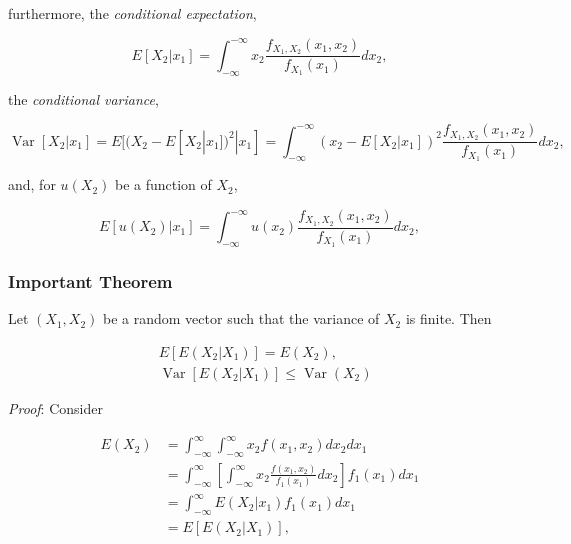 \documentclass{article}
\begin{document}
                furthermore, the \textit{conditional expectation},

                \begin{equation*}
                    E[X_{2} | x_{1}] = \int_{-\infty}^{-\infty} x_{2} \frac{
                     f_{X_{1}, X_{2}}(x_{1}, x_{2}) }{ f_{X_{1}}( x_{1}) } d x_{2},
                \end{equation*}

                the \textit{conditional variance},

                \begin{equation*}
                    \operatorname{Var}[X_{2} | x_{1}] = E[(X_{2} -E[X_{2} | x_{1}])^2 | x_{1}] = \int_{-\infty}^{-\infty} (x_{2} - E[X_{2} | x_{1}])^2 \frac{
                     f_{X_{1}, X_{2}}(x_{1}, x_{2}) }{ f_{X_{1}}( x_{1}) } d x_{2},
                \end{equation*}

                and, for $ u(X_{2}) $ be a function of $ X_{2} $,

                \begin{equation*}
                    E[u(X_{2}) | x_{1}] = \int_{-\infty}^{-\infty} u(x_{2}) \frac{
                     f_{X_{1}, X_{2}}(x_{1}, x_{2}) }{ f_{X_{1}}( x_{1}) } d x_{2},
                \end{equation*}

                \subsubsection{Important Theorem}

                    Let $ ( X_{1}, X_{2} ) $ be a random vector such that the variance of $ X_{2} $ is finite. Then

                    \begin{align*}
                        & E[E(X_{2}|X_{1})] = E(X_{2}),\\
                        & \operatorname{Var}[E(X_{2}|X_{1})] \leq \operatorname{Var}(X_{2})
                    \end{align*}

                    \textit{Proof}: Consider

                    \begin{align*}
                        E(X_{2}) &= \int_{-\infty}^{\infty} \int_{-\infty}^{\infty} x_{2} f(x_{1}, x_{2}) d x_{2} d x_{1} \\
                                 &= \int_{-\infty}^{\infty} \left[
                                     \int_{-\infty}^{\infty} x_{2} \frac{f(x_{1}, x_{2})}{f_{1}(x_{1})} d x_{2} \right] f_{1}(x_{1}) d x_{1} \\
                                 &= \int_{-\infty}^{\infty} E(X_{2}|x_{1}) f_{1}(x_{1}) d x_{1} \\
                                 &= E[E(X_{2}|X_{1})],
                    \end{align*}
\end{document}

